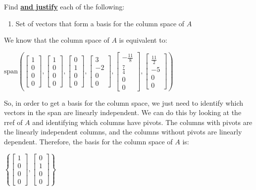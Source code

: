\documentclass[
  letterpaper,
  DIV=11,
  numbers=noendperiod]{scrartcl}
\providecommand{\tightlist}{%
  \setlength{\itemsep}{0pt}\setlength{\parskip}{0pt}}\usepackage{longtable,booktabs,array}
\begin{document}
Find \ul{\textbf{and justify}} each of the following:

\begin{enumerate}
\def\labelenumi{\alph{enumi}.}
\tightlist
\item
  Set of vectors that form a basis for the column space of \(A\)
\end{enumerate}

We know that the column space of \(A\) is equivalent to:

\(\mathrm{span}\left(\begin{bmatrix}1 \\ 0 \\ 0 \\ 0\end{bmatrix},\begin{bmatrix}1 \\ 0 \\ 0 \\ 0\end{bmatrix},\begin{bmatrix}0\\1\\0\\0\end{bmatrix},\begin{bmatrix}3\\-2\\0\\0\end{bmatrix},\begin{bmatrix}-\frac{11}{8}\\ \frac{7}{4}\\0\\0\end{bmatrix},\begin{bmatrix}\frac{11}{2}\\-5\\0\\0\end{bmatrix}\right)\)

So, in order to get a basis for the column space, we just need to
identify which vectors in the span are linearly independent. We can do
this by looking at the rref of \(A\) and identifying which columns have
pivots. The columns with pivots are the linearly independent columns,
and the columns without pivots are linearly dependent. Therefore, the
basis for the column space of \(A\) is:

\(\left\{\begin{bmatrix}1 \\ 0 \\ 0 \\ 0\end{bmatrix},\begin{bmatrix}0 \\ 1 \\ 0 \\ 0\end{bmatrix}\right\}\)
\end{document}

